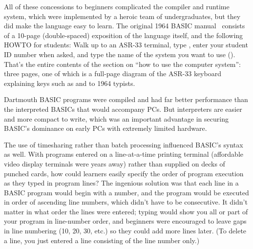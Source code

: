 
All of these concessions to beginners complicated the compiler and
runtime system, which were
implemented by a heroic team of undergraduates,
but they did make the language easy to learn.
The original 1964 BASIC manual~\cite[p. 14]{dartmouth_basic_manual}
consists of a 10-page (double-spaced) exposition of the language
itself, and the following HOWTO for students:
Walk up to an ASR-33 terminal, type , enter your student ID
number when asked, and type the name of the system you want to use
().
That's the entire contents of the section on ``how to use the computer
system'': three pages, one of which is a full-page diagram of the ASR-33
keyboard explaining keys such as  and  to 1964
typists.

\begin{tangent}
  Dartmouth BASIC programs were compiled and had
  far better performance than the interpreted BASICs that would
  accompany PCs. But interpreters are easier and more compact to write, which
  was an important advantage in securing BASIC's dominance on
  early PCs with extremely limited hardware.  
\end{tangent}


The use of timesharing rather than batch processing influenced
BASIC's syntax as well.
With programs entered on a line-at-a-time printing terminal
(affordable video display
terminals were years away) rather than supplied on decks of punched
cards, how could learners easily specify the order of program execution
as they typed in program lines?
The ingenious solution was that each line in a BASIC
program would begin with a number, and the program would be
executed in order of ascending line numbers, which didn't have to be
consecutive.  
It didn't matter in what order the lines were entered;
typing  would show
you all or part of your program in line-number order,
and beginners were encouraged to leave gaps in line
numbering (10, 20, 30, etc.) so they could add
more lines later.  (To delete a line, you just entered a line
consisting of the line number only.)


